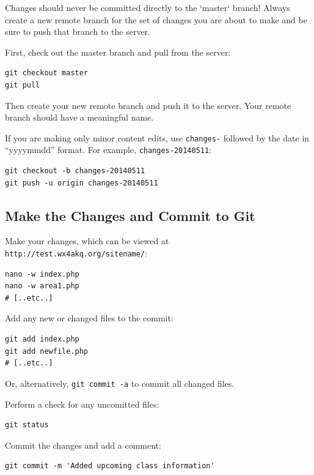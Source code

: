 \documentclass[pdflatex,letterpaper,twoside,12pt]{book}
\begin{document}
Changes should never be committed directly to the `master` branch!  Always create a new remote branch for the set of changes you are about to make and be sure to push that branch to the server.

First, check out the master branch and pull from the server:

\begin{verbatim}
git checkout master
git pull
\end{verbatim}

Then create your new remote branch and push it to the server.  Your remote branch should have a meaningful name.

If you are making only minor content edits, use \texttt{changes-} followed by the date in ``yyyymmdd'' format.  For example, \texttt{changes-20140511}:

\begin{verbatim}
git checkout -b changes-20140511
git push -u origin changes-20140511
\end{verbatim}

\subsection{Make the Changes and Commit to Git}

Make your changes, which can be viewed at \texttt{http://test.wx4akq.org/sitename/}:

\begin{verbatim}
nano -w index.php
nano -w area1.php
# [..etc..]
\end{verbatim}

Add any new or changed files to the commit:

\begin{verbatim}
git add index.php
git add newfile.php
# [..etc..]
\end{verbatim}

Or, alternatively, \texttt{git commit -a} to commit all changed files.

Perform a check for any uncomitted files:

\begin{verbatim}
git status
\end{verbatim}

Commit the changes and add a comment:

\begin{verbatim}
git commit -m 'Added upcoming class information'
\end{verbatim}
\end{document}
